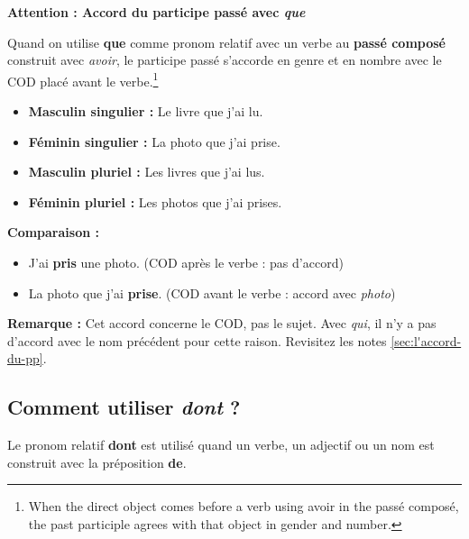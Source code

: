 \documentclass[math,code]{amznotes}
\theoremstyle{remark}
\begin{document}
\begin{notebox}
\textbf{Attention : Accord du participe passé avec \textit{que}}

Quand on utilise \textbf{que} comme pronom relatif avec un verbe au \textbf{passé composé} construit avec \textit{avoir}, le participe passé s'accorde en genre et en nombre avec le COD placé avant le verbe.\footnote{When the direct object comes before a verb using avoir in the passé composé, the past participle agrees with that object in gender and number.}

\begin{itemize}
    \item \textbf{Masculin singulier :} Le livre que j'ai lu.
    \item \textbf{Féminin singulier :} La photo que j'ai prise.
    \item \textbf{Masculin pluriel :} Les livres que j'ai lus.
    \item \textbf{Féminin pluriel :} Les photos que j'ai prises.
\end{itemize}

\textbf{Comparaison :}
\begin{itemize}
    \item J'ai \textbf{pris} une photo. (COD après le verbe : pas d'accord)
    \item La photo que j'ai \textbf{prise}. (COD avant le verbe : accord avec \textit{photo})
\end{itemize}

\textbf{Remarque :} Cet accord concerne le COD, pas le sujet. Avec \textit{qui}, il n'y a pas d'accord avec le nom précédent pour cette raison. Revisitez les notes \ref{sec:l'accord-du-pp}.
\end{notebox}


\subsection*{Comment utiliser \textit{dont} ?}

Le pronom relatif \textbf{dont} est utilisé quand un verbe, un adjectif ou un nom est construit avec la préposition \textbf{de}.
\end{document}
